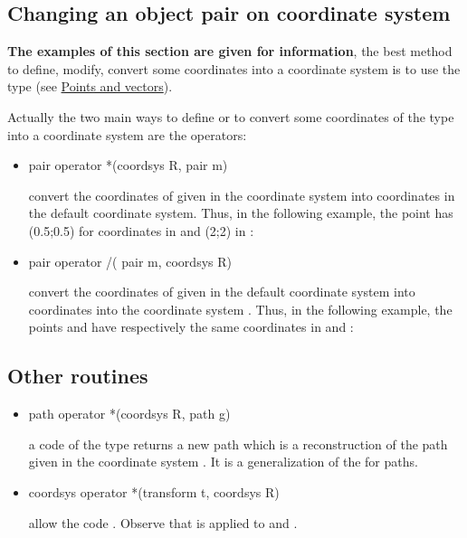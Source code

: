 \documentclass[pdftex]{article}
\begin{document}
\subsection{Changing an object  pair on coordinate system}
\textbf{The examples of this section are given for information}, the
best method to define, modify, convert some coordinates into a coordinate system is to
use the type  (see \href{#section.point}{Points and vectors}).

Actually the two main ways to define or to convert some coordinates of the
type  into a coordinate system are the operators:
\begin{itemize}
\item {}
  \begin{Vcolor}
    pair operator *(coordsys R, pair m)
  \end{Vcolor}
  convert the coordinates of  given in the coordinate
  system  into coordinates in the default coordinate system.
  Thus, in the following example, the point  has (0.5;0.5) for coordinates
  in  and (2;2) in :
\item {}
  \begin{Vcolor}
    pair operator /( pair m, coordsys R)
  \end{Vcolor}
  convert the coordinates of  given in the default coordinate system
  into coordinates into the coordinate system . Thus,
  in the following example, the points  and  have respectively
  the same coordinates in  and :
\end{itemize}

\subsection{Other routines}
\begin{itemize}
\item {}
  \begin{Vcolor}
    path operator *(coordsys R, path g)
  \end{Vcolor}
  a code of the type  returns a new path which is
  a reconstruction of the path  given in the
  coordinate system . It is a generalization of the
   for paths.
\item {}
  \begin{Vcolor}
    coordsys operator *(transform t, coordsys R)
  \end{Vcolor}
  allow the code . Observe that
   is applied to  and .
\end{itemize}
\end{document}
